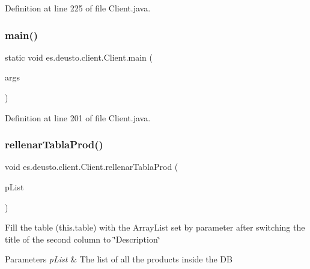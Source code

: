 Definition at line 225 of file Client.\+java.

\mbox{\label{classes_1_1deusto_1_1client_1_1_client_a69a7526d0af9cb2341f4bf341b501152}} 
\subsubsection{\texorpdfstring{main()}{main()}}
{\footnotesize\ttfamily static void es.\+deusto.\+client.\+Client.\+main (\begin{DoxyParamCaption}\item[{String \mbox{[}$\,$\mbox{]}}]{args }\end{DoxyParamCaption})\hspace{0.3cm}{\ttfamily [static]}}



Definition at line 201 of file Client.\+java.

\mbox{\label{classes_1_1deusto_1_1client_1_1_client_a141b9b15a5ba7dc5b3daf2032529575f}} 
\subsubsection{\texorpdfstring{rellenar\+Tabla\+Prod()}{rellenarTablaProd()}}
{\footnotesize\ttfamily void es.\+deusto.\+client.\+Client.\+rellenar\+Tabla\+Prod (\begin{DoxyParamCaption}\item[{Array\+List$<$ \hyperlink{classes_1_1deusto_1_1server_1_1db_1_1data_1_1_product}{Product} $>$}]{p\+List }\end{DoxyParamCaption})}

Fill the table (this.\+table) with the Array\+List set by parameter after switching the title of the second column to \char`\"{}\+Description\char`\"{} 
\begin{DoxyParams}{Parameters}
{\em p\+List} & The list of all the products inside the DB \\
\hline
\end{DoxyParams}


